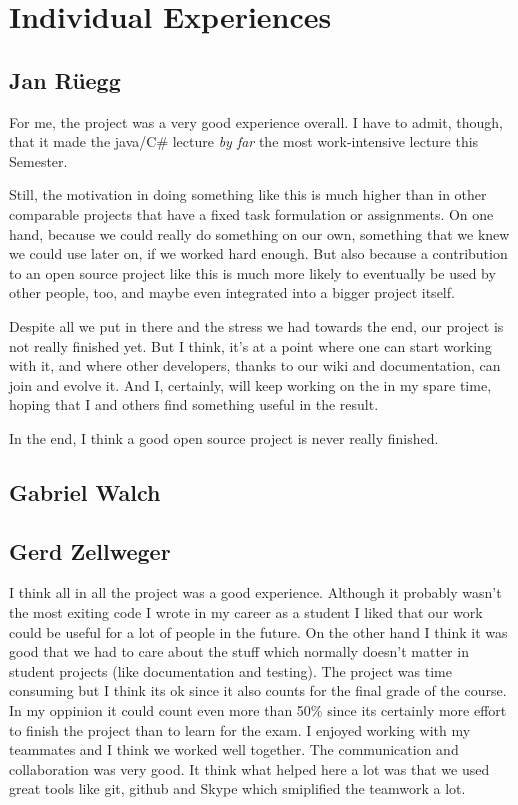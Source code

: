 \section{Individual Experiences}
\label{individual}

\subsection{Jan Rüegg}
\label{individual:jan}
For me, the project was a very good experience overall. I have to admit, though, that it made the java/C\# lecture \textit{by far} the most work-intensive lecture this Semester.

Still, the motivation in doing something like this is much higher than in other comparable projects that have a fixed task formulation or assignments. On one hand, because we could really do something on our own, something that we knew we could use later on, if we worked hard enough. But also because a contribution to an open source project like this is much more likely to eventually be used by other people, too, and maybe even integrated into a bigger project itself.

Despite all we put in there and the stress we had towards the end, our project is not really finished yet. But I think, it's at a point where one can start working with it, and where other developers, thanks to our wiki and documentation, can join and evolve it. And I, certainly, will keep working on the in my spare time, hoping that I and others find something useful in the result.

In the end, I think a good open source project is never really finished.

\subsection{Gabriel Walch}
\label{individual:gabriel}

\subsection{Gerd Zellweger}
\label{individual:gerd}
I think all in all the project was a good experience. Although it probably wasn't the most exiting code I wrote in my career as a student I liked that our work could be useful for a lot of people in the future. On the other hand I think it was good that we had to care about the stuff which normally doesn't matter in student projects (like documentation and testing). The project was time consuming but I think its ok since it also counts for the final grade of the course. In my oppinion it could count even more than 50\% since its certainly more effort to finish the project than to learn for the exam.
I enjoyed working with my teammates and I think we worked well together. The communication and collaboration was very good. It think what helped here a lot was that we used great tools like git, github and Skype which smiplified the teamwork a lot.